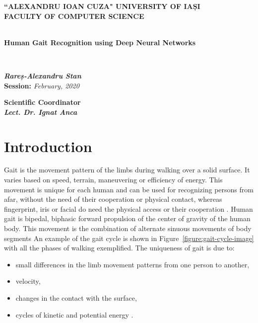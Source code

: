 \documentclass[12pt]{article}
\theoremstyle{definition}
\begin{document}
	\begin{titlepage}
		\begin{center}
			\textbf{``ALEXANDRU IOAN CUZA" UNIVERSITY OF IAȘI}
			\
			\\
			\textbf{FACULTY OF COMPUTER SCIENCE}\\
			\vspace{6cm}
			\
			\\
			\begin{huge}
				\textbf{Human Gait Recognition using Deep Neural Networks}
			\end{huge}
			\\
			\begin{large}
				\vspace{3cm}
				\textit{\textbf{Rareș-Alexandru Stan}}
				\\
				\vspace{3cm}
				\textbf{Session:} \textit{February, 2020}
				\\
			\end{large}
			\vspace{3cm}
			\textbf{Scientific Coordinator}
			\
			\\
			\textit{\textbf{Lect. Dr. Ignat Anca}	}
		\end{center}
	\end{titlepage}

	\clearpage
	\tableofcontents
	\clearpage

	\section{Introduction}
	\vspace{1cm}

	Gait is the movement pattern of the limbs during walking over a solid surface. It varies based on speed, terrain, maneuvering or efficiency of energy. This movement is unique for each human and can be used for recognizing persons from afar, without the need of their cooperation or physical contact, whereas fingerprint, iris or facial do need the physical access or their cooperation \cite{biometrics-comparison}. Human gait is bipedal, biphasic forward propulsion of the center of gravity of the human body. This movement is the combination of alternate sinuous movements of body segments An example of the gait cycle is shown in Figure~\ref{figure:gait-cycle-image} with all the phases of walking exemplified. The uniqueness of gait is due to:
	\begin{itemize}
		\item small differences in the limb movement patterns from one person to another,
		\item velocity,
		\item changes in the contact with the surface,
		\item cycles of kinetic and potential energy \cite{gait-biomecanics}.
	\end{itemize}
\end{document}
